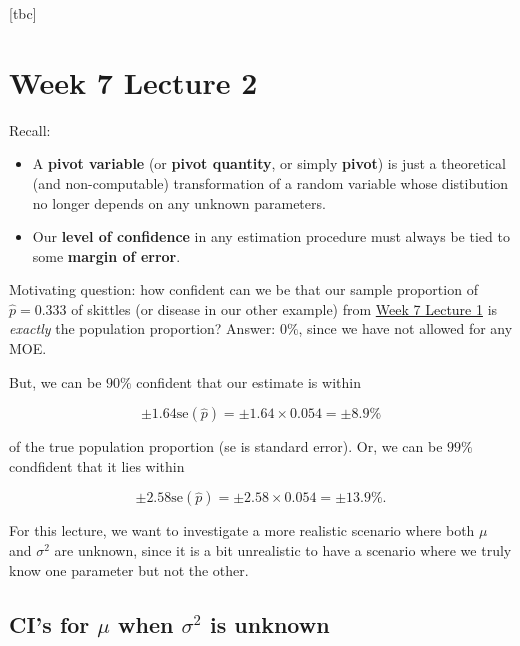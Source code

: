 [tbc]



\section{Week 7 Lecture 2}\label{sec:w7lec2}

Recall:

\begin{itemize}
    \item A \textbf{pivot variable} (or \textbf{pivot quantity}, or simply \textbf{pivot}) is just a theoretical (and non-computable) transformation of a random variable whose distibution no longer depends on any unknown parameters.
    \item Our \textbf{level of confidence} in any estimation procedure must always be tied to some \textbf{margin of error}. 
\end{itemize}

Motivating question: how confident can we be that our sample proportion of \(\hat{p} = 0.333\) of skittles (or disease in our other example) from \hyperref[sec:w7lec1]{Week 7 Lecture 1} is \textit{exactly} the population proportion?
Answer: \(0\%\), since we have not allowed for any MOE. 

\bigskip

But, we can be \(90\%\) confident that our estimate is within

\begin{equation*}
    \pm1.64 \text{se}(\hat{p}) = \pm 1.64 \times 0.054 = \pm 8.9\%
\end{equation*}

of the true population proportion (se is standard error). 
Or, we can be \(99\%\) condfident that it lies within 

\begin{equation*}
    \pm2.58 \text{se}(\hat{p}) = \pm 2.58  \times 0.054 = \pm 13.9\%.
\end{equation*}

For this lecture, we want to investigate a more realistic scenario where both \(\mu\) and \(\sigma^2\) are unknown, since it is a bit unrealistic to have a scenario where we truly know one parameter but not the other. 

\subsection{CI's for \texorpdfstring{\(\mu\)}{mu} when \texorpdfstring{\(\sigma^2\)}{sigma\^2} is unknown} \label{subsec:CI for mu, sigma unknown}

